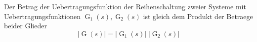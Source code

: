 Der Betrag der Uebertragungsfunktion der Reihenschaltung zweier Systeme mit Uebertragungsfunktionen $\operatorname{G}_1(s), \operatorname{G}_2(s)$ ist gleich dem Produkt der Betraege beider Glieder
$$| \operatorname{G}(s) | = | \operatorname{G}_1(s)| \;  | \operatorname{G}_2(s) |$$
